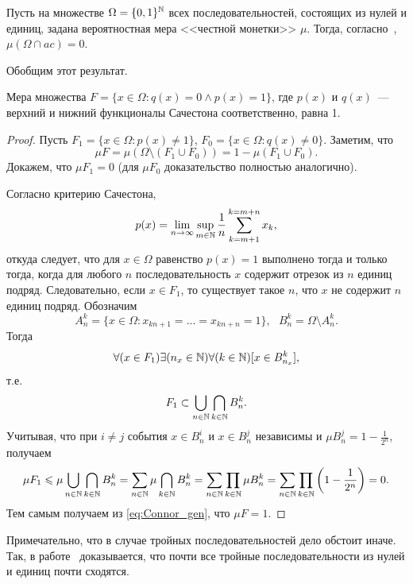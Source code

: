 Пусть на множестве $\Omega=\{0,1\}^{\mathbb{N}}$ всех последовательностей, состоящих из нулей и единиц,
задана вероятностная мера <<честной монетки>> $\mu$.
Тогда, согласно~\cite{connor1990almost}, $\mu(\Omega\cap ac)=0$.

Обобщим этот результат.
\begin{theorem}
	\label{thm:Connor_generalized}
	Мера множества $F=\{x\in\Omega : q(x) = 0 \wedge p(x)= 1\}$,
	где $p(x)$ и $q(x)$~--- верхний и нижний функционалы Сачестона соответственно,
	равна 1.
\end{theorem}

\begin{proof}
	Пусть $F_1=\{x\in\Omega : p(x) \neq 1\}$, $F_0=\{x\in\Omega : q(x) \neq 0\}$.
	Заметим, что
	\begin{equation}
		\label{eq:Connor_gen}
		\mu F = \mu (\Omega\setminus(F_1 \cup F_0)) = 1 - \mu (F_1 \cup F_0)
		.
	\end{equation}
	Докажем, что $\mu F_1 = 0 $	(для $\mu F_0$  доказательство полностью аналогично).

	Согласно критерию Сачестона,
	\begin{equation}
		p(x) = \lim_{n\to\infty} \sup_{m\in\mathbb{N}} \frac{1}{n} \sum_{k=m+1}^{k=m+n} x_k
		,
	\end{equation}
	откуда следует, что
	для $x\in\Omega$ равенство $p(x) = 1$ выполнено тогда и только тогда,
	когда для любого $n$ последовательность $x$ содержит отрезок из $n$ единиц подряд.
%
	Следовательно, если $x\in F_1$,
	то существует такое $n$,
	что $x$ не содержит $n$ единиц подряд.
%
%
	Обозначим
	\begin{equation}
		A_n^k = \{x\in\Omega : x_{kn+1} = ... = x_{kn+n} = 1\}
		,
		~~~
		B_n^k = \Omega \setminus A_n^k
		.
	\end{equation}
	Тогда
	\begin{equation}
		\forall(x\in F_1)\exists(n_x\in\mathbb{N})\forall(k\in\mathbb{N})[x\in B_{n_x}^k]
		,
	\end{equation}
	т.е.
	\begin{equation}
		F_1 \subset \bigcup_{n\in\mathbb{N}} \bigcap_{k\in\mathbb{N}} B_{n}^k
		.
	\end{equation}
	Учитывая, что при $i\neq j$ события $x\in B_n^i$ и $x\in B_n^j$ независимы и $\mu B_n^j = 1-\frac{1}{2^n}$,
	получаем
	\begin{equation}
		\mu F_1 \leqslant \mu \bigcup_{n\in\mathbb{N}} \bigcap_{k\in\mathbb{N}} B_{n}^k
		=
		\sum_{n\in\mathbb{N}} \mu \bigcap_{k\in\mathbb{N}} B_{n}^k
		=
		\sum_{n\in\mathbb{N}}  \prod_{k\in\mathbb{N}} \mu B_{n}^k
		=
		\sum_{n\in\mathbb{N}}  \prod_{k\in\mathbb{N}} \left( 1-\frac{1}{2^n} \right)
		=0
		.
	\end{equation}
	Тем самым получаем из \eqref{eq:Connor_gen}, что $\mu F = 1$.
\end{proof}

\begin{remark}
	Примечательно, что в случае тройных последовательностей дело обстоит иначе.
	Так, в работе~\cite{esi2014almost} доказывается, что почти все тройные последовательности из нулей и единиц почти сходятся.
\end{remark}
